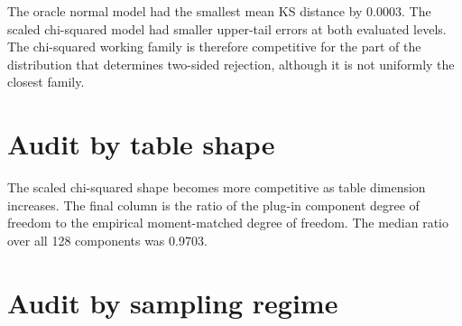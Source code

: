 The oracle normal model had the smallest mean KS distance by 0.0003. The
scaled chi-squared model had smaller upper-tail errors at both evaluated
levels. The chi-squared working family is therefore competitive for the part
of the distribution that determines two-sided rejection, although it is not
uniformly the closest family.

\section{Audit by table shape}

\begin{table}[htbp]
\centering
\caption{Oracle distributional fit by table shape.}
\label{tab:appendix-scaled-chi-shape}
\small
{}
\end{table}

The scaled chi-squared shape becomes more competitive as table dimension
increases. The final column is the ratio of the plug-in component degree of
freedom to the empirical moment-matched degree of freedom. The median ratio
over all 128 components was 0.9703.

\section{Audit by sampling regime}


